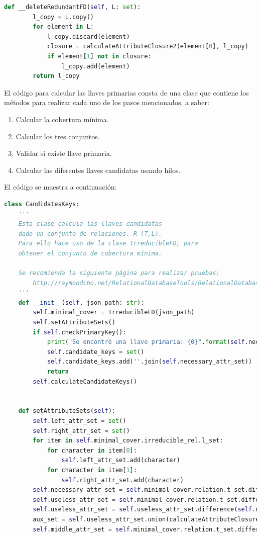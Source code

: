 \documentclass[a4paper,12pt]{article}
\begin{document}
{\begin{lstlisting}[language=python, caption={Clase que calcula la cobertura mínima y valida conjuntos de dependencias equivalentes.\\\hspace{\textwidth}}, captionpos=t]
    def __deleteRedundantFD(self, L: set):
        l_copy = L.copy()
        for element in L:
            l_copy.discard(element)
            closure = calculateAttributeClosure2(element[0], l_copy)
            if element[1] not in closure:
                l_copy.add(element)
        return l_copy

\end{lstlisting}

El código para calcular las llaves primarias consta de una clase que contiene los métodos para realizar cada uno de los pasos mencionados, a saber:
\begin{enumerate}
\item Calcular la cobertura mínima.
\item Calcular los tres conjuntos.
\item Validar si existe llave primaria.
\item Calcular las diferentes llaves candidatas usando hilos.
\end{enumerate}

El código se muestra a continuación:

\begin{lstlisting}[language=python, caption={Algoritmo que calcula las llaves candidatas.\\\hspace{\textwidth}}, captionpos=t]
class CandidatesKeys:
    '''
    Esta clase calcula las llaves candidatas
    dado un conjunto de relaciones. R (T,L).
    Para ello hace uso de la clase IrreducibleFD, para
    obtener el conjunto de cobertura mínima.

    Se recomienda la siguiente página para realizar pruebas:
        http://raymondcho.net/RelationalDatabaseTools/RelationalDatabaseTools
    '''
    def __init__(self, json_path: str):
        self.minimal_cover = IrreducibleFD(json_path)
        self.setAttributeSets()
        if self.checkPrimaryKey():
            print("Se encontró una llave primaria: {0}".format(self.necessary_attr_set))
            self.candidate_keys = set()
            self.candidate_keys.add(''.join(self.necessary_attr_set))
            return
        self.calculateCandidateKeys()


    def setAttributeSets(self):
        self.left_attr_set = set()
        self.right_attr_set = set()
        for item in self.minimal_cover.irreducible_rel.l_set:
            for character in item[0]:
                self.left_attr_set.add(character)
            for character in item[1]:
                self.right_attr_set.add(character)
        self.necessary_attr_set = self.minimal_cover.relation.t_set.difference(self.right_attr_set)
        self.useless_attr_set = self.minimal_cover.relation.t_set.difference(self.left_attr_set)
        self.useless_attr_set = self.useless_attr_set.difference(self.necessary_attr_set)
        aux_set = self.useless_attr_set.union(calculateAttributeClosure2("".join(self.necessary_attr_set), self.minimal_cover.irreducible_rel.l_set))
        self.middle_attr_set = self.minimal_cover.relation.t_set.difference(aux_set)


\end{lstlisting}}
\end{document}
